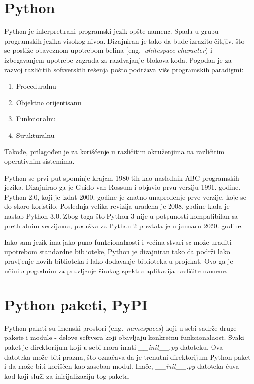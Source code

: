 \documentclass[12pt]{report}
\begin{document}
\section{Python}

Python \cite{python} je interpretirani programski jezik opšte namene. Spada u grupu programskih jezika visokog nivoa. Dizajniran je tako da bude izrazito čitljiv, što se postiže obaveznom upotrebom belina (eng.\ \textit{whitespace character}) i izbegavanjem upotrebe zagrada za razdvajanje blokova koda. Pogodan je za razvoj različitih softverskih rešenja pošto podržava više programskih paradigmi:

\begin{enumerate}
    \item Proceduralnu
    \item Objektno orijentisanu
    \item Funkcionalnu
    \item Strukturalnu
\end{enumerate}

Takođe, prilagođen je za korišćenje u različitim okruženjima na različitim operativnim sistemima.

Python se prvi put spominje krajem 1980-tih kao naslednik ABC programskih jezika. Dizajnirao ga je Guido van Rossum i objavio prvu verziju 1991. godine. Python 2.0, koji je izdat 2000. godine je znatno unapređenje prve verzije, koje se do skoro koristilo.  Poslednja velika revizija urađena je 2008. godine kada je nastao Python 3.0. Zbog toga što Python 3 nije u potpunosti kompatibilan sa prethodnim verzijama, podrška za Python 2 prestala je u januaru 2020. godine.

Iako sam jezik ima jako puno funkcionalnosti i većina stvari se može uraditi upotrebom standardne biblioteke, Python je dizajniran tako da podrži lako pravljenje novih biblioteka i lako dodavanje biblioteka u projekat. Ovo ga je učinilo pogodnim za pravljenje širokog spektra aplikacija različite namene.

\section{Python paketi, PyPI}

Python paketi su imenski prostori (eng.\ \textit{namespaces}) koji u sebi sadrže druge pakete i module - delove softvera koji obavljaju konkretnu funkcionalnost. Svaki paket je direktorijum koji u sebi mora imati \textit{\_\_init\_\_.py} datoteku. Ova datoteka može biti prazna, što označava da je trenutni direktorijum Python paket i da može biti korišćen kao zaseban modul. Inače, \textit{\_\_init\_\_.py} datoteka čuva kod koji služi za inicijalizaciju tog paketa.
\end{document}
